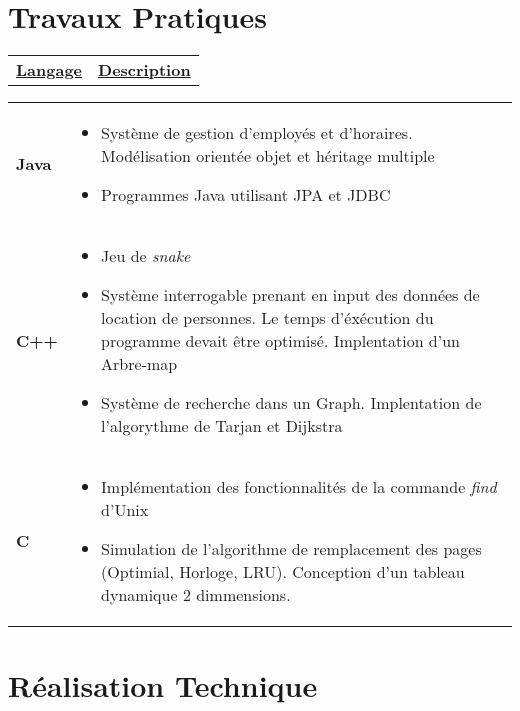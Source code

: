 \documentclass[a4paper,9pt]{extarticle}
\begin{document}
\newpage
\section{Travaux Pratiques}
\begin{tabular*}{\textwidth}{p{ }
						 	 p{ }} 
\centering\textbf{\underline{Langage}} &\centering\textbf{\underline{Description}}
\end{tabular*}

\begin{tabular*}{\linewidth}{p{ }
						 	 p{ }} 
						 	 
\textbf{Java} &  \vspace{-0.5em}
\begin{itemize}

\item Système de gestion d'employés et d'horaires. Modélisation orientée objet et héritage multiple
\item Programmes Java utilisant  JPA et JDBC 
\end{itemize}
\\
\textbf{C++} & \vspace{-0.5em}

\begin{itemize}
\item Jeu de \emph{snake}
\item Système interrogable prenant en input des données de location de personnes. Le temps d'éxécution du programme devait être optimisé. Implentation d'un Arbre-map
\item Système de recherche dans un Graph. Implentation de l'algorythme de Tarjan et Dijkstra
\end{itemize}
\\
\textbf{C} & \vspace{-0.5em}

\begin{itemize}
\item Implémentation des fonctionnalités de la commande \emph{find} d'Unix
\item Simulation de l'algorithme de remplacement des pages (Optimial, Horloge, LRU). Conception d'un tableau dynamique 2 dimmensions.
\end{itemize}


\end{tabular*}

\section{Réalisation Technique}
\end{document}
